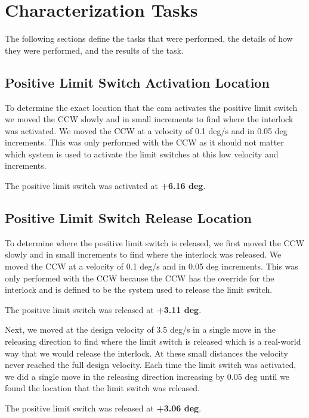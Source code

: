 \documentclass[SE,lsstdraft,authoryear,toc]{lsstdoc}
\begin{document}
\section{Characterization Tasks}\label{sec:Characterization Tasks}

The following sections define the tasks that were performed, the details
of how they were performed, and the results of the task.

\subsection{Positive Limit Switch Activation Location}

To determine the exact location that the cam activates the positive
limit switch we moved the CCW slowly and in small increments to find
where the interlock was activated. We moved the CCW at a velocity of 0.1
deg/s and in 0.05 deg increments. This was only performed with the CCW
as it should not matter which system is used to activate the limit
switches at this low velocity and increments.

The positive limit switch was activated at \textbf{+6.16 deg}.

\subsection{Positive Limit Switch Release Location}

To determine where the positive limit switch is released, we first moved
the CCW slowly and in small increments to find where the interlock was
released. We moved the CCW at a velocity of 0.1 deg/s and in 0.05 deg
increments. This was only performed with the CCW because the CCW has the
override for the interlock and is defined to be the system used to
release the limit switch.

The positive limit switch was released at \textbf{+3.11 deg}.

Next, we moved at the design velocity of 3.5 deg/s in a single move in
the releasing direction to find where the limit switch is released which
is a real-world way that we would release the interlock. At these small
distances the velocity never reached the full design velocity. Each time
the limit switch was activated, we did a single move in the releasing
direction increasing by 0.05 deg until we found the location that the
limit switch was released.

The positive limit switch was released at \textbf{+3.06 deg}.
\end{document}
